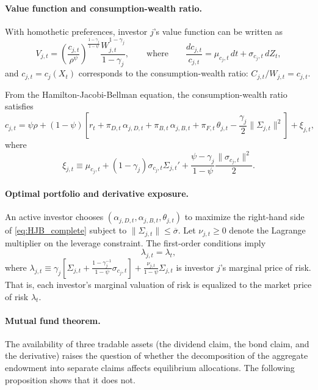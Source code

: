 \documentclass[12pt,english]{article}
\begin{document}
\paragraph{Value function and consumption-wealth ratio.} With homothetic preferences, investor $j$'s value function can be written as
\begin{equation}\nonumber
    V_{j,t} = \left( \frac{c_{j,t}}{\rho^\psi} \right)^{\frac{1-\gamma_j}{1-\psi}} 
    \frac{W_{j,t}^{1-\gamma_j}}{1-\gamma_j}, \qquad \text{where} \qquad \frac{dc_{j,t}}{c_{j,t}} = \mu_{c_j,t}\, dt + \sigma_{c_j,t}\, dZ_t,
\end{equation}
and $c_{j,t} = c_j(X_t)$ corresponds to the consumption-wealth ratio: $C_{j,t}/W_{j,t} = c_{j,t}$.

From the Hamilton-Jacobi-Bellman equation, the consumption-wealth ratio satisfies
\begin{equation}\label{eq:HJB_complete}
    c_{j,t} = \psi \rho 
    + (1-\psi) \left[ r_t + \pi_{D,t}\,\alpha_{j,D,t} + \pi_{B,t}\,\alpha_{j,B,t} + \pi_{F,t}\,\theta_{j,t}
        - \frac{\gamma_j}{2} \|\Sigma_{j,t}\|^2 \right] 
    + \xi_{j,t},
\end{equation}
where 
\[
    \xi_{j,t} \equiv \mu_{c_j,t} 
    + (1-\gamma_j) \sigma_{c_j,t} \Sigma_{j,t}' 
    + \frac{\psi - \gamma_j}{1-\psi} \frac{\|\sigma_{c_j,t}\|^2}{2}.
\]

\paragraph{Optimal portfolio and derivative exposure.} 
An active investor chooses $(\alpha_{j,D,t},\alpha_{j,B,t},\theta_{j,t})$ to maximize the right-hand side of \eqref{eq:HJB_complete} subject to $\|\Sigma_{j,t}\|\le\overline{\sigma}$. 
Let $\nu_{j,t}\ge 0$ denote the Lagrange multiplier on the leverage constraint. The first-order conditions imply
\begin{equation}\label{eq:foc_lambda}
    \lambda_{j,t} = \lambda_t,
\end{equation}
where $\lambda_{j,t} \equiv \gamma_j \left[\Sigma_{j,t} + \frac{1 - \gamma_j^{-1}}{1-\psi} \sigma_{c_j,t}\right] + \frac{\nu_{j,t}}{1-\psi} \Sigma_{j,t}$ is investor $j$'s marginal price of risk. That is, each investor's marginal valuation of risk is equalized to the market price of risk $\lambda_t$.

\paragraph{Mutual fund theorem.}
The availability of three tradable assets (the dividend claim, the bond claim, and the derivative) raises the question of whether the decomposition of the aggregate endowment into separate claims affects equilibrium allocations. The following proposition shows that it does not.
\end{document}
